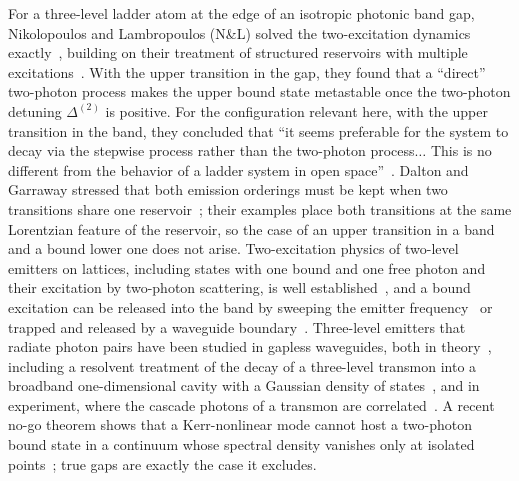 \documentclass[aps,prresearch,twocolumn,superscriptaddress,nofootinbib,longbibliography,floatfix]{revtex4-2}
\begin{document}
For a three-level ladder atom at the edge of an isotropic photonic band gap, Nikolopoulos and Lambropoulos (N\&L) solved
the two-excitation dynamics exactly~\cite{NikolopoulosLambropoulos2000}, building on their treatment of structured
reservoirs with multiple excitations~\cite{BayLambropoulosMolmer1997,Lambropoulos2000RPP}. With the upper transition in the gap, they
found that a ``direct'' two-photon process makes the upper bound state metastable once the two-photon detuning
$\Delta^{(2)}$ is positive. For the configuration relevant here, with the upper transition in the band, they concluded
that ``it seems preferable for the system to decay via the stepwise process rather than the two-photon process$\ldots$
This is no different from the behavior of a ladder system in open space''~\cite{NikolopoulosLambropoulos2000}. Dalton
and Garraway stressed that both emission orderings must be kept when two transitions share one
reservoir~\cite{DaltonGarraway2003,GarrawayDalton2006}; their examples place both transitions at the same Lorentzian
feature of the reservoir, so the case of an upper transition in a band and a bound lower one does not arise. Two-excitation physics of two-level emitters on
lattices, including states with one bound and one free photon and their excitation by two-photon scattering, is well
established~\cite{Longo2010,ShiChangCirac2015,ShiWuGonzalezTudelaCirac2016,Calajo2016,SanchezBurillo2017,Calajo2019,Trivedi2021},
and a bound excitation can be released into the band by sweeping the emitter frequency~\cite{CastilloMoreno2025} or
trapped and released by a waveguide boundary~\cite{Tufarelli2013}.
Three-level emitters that radiate photon pairs have been studied in gapless waveguides, both in theory~\cite{SanchezBurillo2014,SanchezBurillo2016,Chuikin2026,Gao2024,Rieck2025},
including a resolvent treatment of the decay of a three-level transmon into a broadband one-dimensional cavity with a
Gaussian density of states~\cite{Greenberg2026}, and in experiment, where the cascade photons of a transmon are correlated~\cite{Gasparinetti2017}. A recent no-go
theorem shows that a Kerr-nonlinear mode cannot host a two-photon bound state in a continuum whose spectral density
vanishes only at isolated points~\cite{Chang2026}; true gaps are exactly the case it excludes.
\end{document}
